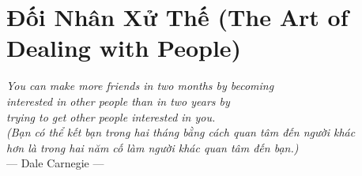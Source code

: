 \chapter{Đối Nhân Xử Thế (The Art of Dealing with People)}
\begin{center}
  \textit{\color{truyenblue}You can make more friends in two months by becoming\\
  interested in other people than in two years by\\
  trying to get other people interested in you.}\\
  \textit{(Bạn có thể kết bạn trong hai tháng bằng cách quan tâm đến người khác\\
  hơn là trong hai năm cố làm người khác quan tâm đến bạn.)}\\[4pt]
  \small\color{truyengold}--- Dale Carnegie ---
\end{center}
\ngancach

